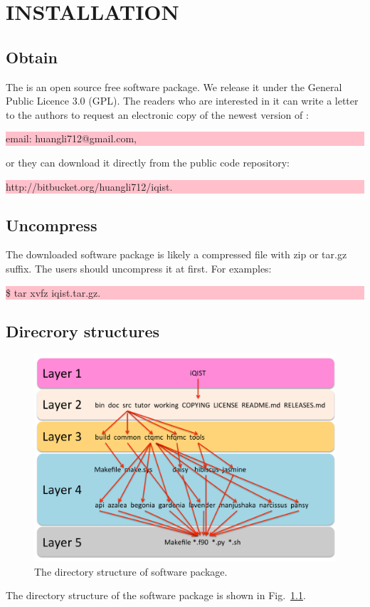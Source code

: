 \chapter{INSTALLATION}
\section{Obtain}

The {\iqist} is an open source free software package. We release it under the General Public Licence 3.0 (GPL). The readers who are interested in it can write a letter to the authors to request an electronic copy of the newest version of {\iqist}:
 
\noindent\colorbox{pink}{\parbox[r]{\linewidth}{\quad email: huangli712@gmail.com,}}
or they can download it directly from the public code repository:

\noindent\colorbox{pink}{\parbox[r]{\linewidth}{\quad http://bitbucket.org/huangli712/iqist.}}

\section{Uncompress}

The downloaded {\iqist} software package is likely a compressed file with zip or tar.gz suffix. The users should uncompress it at first. For examples:

\noindent\colorbox{pink}{\parbox[r]{\linewidth}{\quad \$ tar xvfz iqist.tar.gz.}}

\section{Direcrory structures}
\begin{figure}[ht]
\centering
\includegraphics[scale=0.6]{figure/dir.pdf}
\caption{The directory structure of {\iqist} software package.\label{fig:dir}}
\end{figure}
The directory structure of the {\iqist} software package is shown in Fig.~\ref{fig:dir}.

